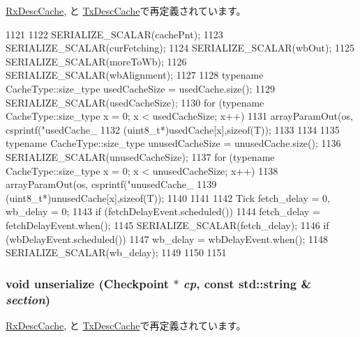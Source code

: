 \hyperlink{classIGbE_1_1RxDescCache_a53e036786d17361be4c7320d39c99b84}{RxDescCache}, と \hyperlink{classIGbE_1_1TxDescCache_a53e036786d17361be4c7320d39c99b84}{TxDescCache}で再定義されています。


\begin{DoxyCode}
1121 {
1122     SERIALIZE_SCALAR(cachePnt);
1123     SERIALIZE_SCALAR(curFetching);
1124     SERIALIZE_SCALAR(wbOut);
1125     SERIALIZE_SCALAR(moreToWb);
1126     SERIALIZE_SCALAR(wbAlignment);
1127 
1128     typename CacheType::size_type usedCacheSize = usedCache.size();
1129     SERIALIZE_SCALAR(usedCacheSize);
1130     for (typename CacheType::size_type x = 0; x < usedCacheSize; x++) {
1131         arrayParamOut(os, csprintf("usedCache_%
1132                       (uint8_t*)usedCache[x],sizeof(T));
1133     }
1134 
1135     typename CacheType::size_type unusedCacheSize = unusedCache.size();
1136     SERIALIZE_SCALAR(unusedCacheSize);
1137     for (typename CacheType::size_type x = 0; x < unusedCacheSize; x++) {
1138         arrayParamOut(os, csprintf("unusedCache_%
1139                       (uint8_t*)unusedCache[x],sizeof(T));
1140     }
1141 
1142     Tick fetch_delay = 0, wb_delay = 0;
1143     if (fetchDelayEvent.scheduled())
1144         fetch_delay = fetchDelayEvent.when();
1145     SERIALIZE_SCALAR(fetch_delay);
1146     if (wbDelayEvent.scheduled())
1147         wb_delay = wbDelayEvent.when();
1148     SERIALIZE_SCALAR(wb_delay);
1149 
1150 
1151 }
\end{DoxyCode}
\hypertarget{classIGbE_1_1DescCache_af22e5d6d660b97db37003ac61ac4ee49}{
\subsubsection[{unserialize}]{\setlength{\rightskip}{0pt plus 5cm}void unserialize ({\bf Checkpoint} $\ast$ {\em cp}, \/  const std::string \& {\em section})}}
\label{classIGbE_1_1DescCache_af22e5d6d660b97db37003ac61ac4ee49}


\hyperlink{classIGbE_1_1RxDescCache_af22e5d6d660b97db37003ac61ac4ee49}{RxDescCache}, と \hyperlink{classIGbE_1_1TxDescCache_af22e5d6d660b97db37003ac61ac4ee49}{TxDescCache}で再定義されています。


